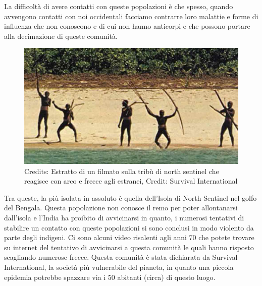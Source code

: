 \documentclass[12pt]{book} %
\begin{document}
La difficoltà di avere contatti con queste popolazioni è che spesso, quando avvengono contatti con noi occidentali
facciamo contrarre loro malattie e forme di influenza che non conoscono e di cui non hanno anticorpi e che possono
portare alla decimazione di queste comunità.

\begin{figure}
  \centering
  \includegraphics[width=0.95\linewidth]{images/Libro-img044.jpg}
  \begin{minipage}{\linewidth}
    \caption{Credits: Estratto di un filmato sulla tribù di north
sentinel che reagisce con arco e frecce agli estranei, Credit: Survival International}
  \end{minipage}
\end{figure}

Tra queste, la più isolata in assoluto è quella dell'Isola di North Sentinel nel golfo del Bengala.
Questa popolazione non conosce il remo per poter allontanarsi dall'isola e
l'India ha proibito di avvicinarsi in quanto, i numerosi tentativi di stabilire un contatto con
queste popolazioni si sono conclusi in modo violento da parte degli indigeni. Ci sono alcuni video risalenti agli anni
70 che potete trovare su internet del tentativo di avvicinarsi a questa comunità le quali hanno risposto scagliando
numerose frecce. Questa comunità è stata dichiarata da Survival International, la società più vulnerabile del pianeta,
in quanto una piccola epidemia potrebbe spazzare via i 50 abitanti (circa) di questo luogo.

\bigskip
\end{document}
